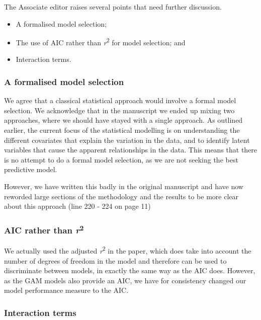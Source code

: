 \documentclass[]{elsarticle} %
\providecommand{\tightlist}{%
  \setlength{\itemsep}{0pt}\setlength{\parskip}{0pt}}
\begin{document}
The Associate editor raises several points that need further discussion.

\begin{itemize}
\tightlist
\item
  A formalised model selection;
\item
  The use of AIC rather than \emph{r}\textsuperscript{2} for model selection; and
\item
  Interaction terms.
\end{itemize}

\hypertarget{a-formalised-model-selection}{%
\subsubsection{A formalised model selection}\label{a-formalised-model-selection}}

We agree that a classical statistical approach would involve a formal model selection. We acknowledge that in the manuscript we ended up mixing two approaches, where we should have stayed with a single approach. As outlined earlier, the current focus of the statistical modelling is on understanding the different covariates that explain the variation in the data, and to identify latent variables that cause the apparent relationships in the data. This means that there is no attempt to do a formal model selection, as we are not seeking the best predictive model.

However, we have written this badly in the original manuscript and have now reworded large sections of the methodology and the results to be more clear about this approach (line 220 - 224 on page 11)

\hypertarget{aic-rather-than-r2}{%
\subsubsection{\texorpdfstring{AIC rather than \emph{r}\textsuperscript{2}}{AIC rather than r2}}\label{aic-rather-than-r2}}

We actually used the adjusted \emph{r}\textsuperscript{2} in the paper, which does take into account the number of degrees of freedom in the model and therefore can be used to discriminate between models, in exactly the same way as the AIC does. However, as the GAM models also provide an AIC, we have for consistency changed our model performance measure to the AIC.

\hypertarget{interaction-terms}{%
\subsubsection{Interaction terms}\label{interaction-terms}}
\end{document}
